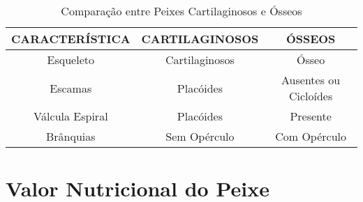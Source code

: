 \documentclass[a4paper, 11pt]{article}
\begin{document}
\begin{table}[h!]
\centering
\caption{Comparação entre Peixes Cartilaginosos e Ósseos}
\vskip 0.6cm
\begin{tabular}{c||c c}
\hline
\textbf{CARACTERÍSTICA} & \textbf{CARTILAGINOSOS} & \textbf{ÓSSEOS} \\
\hline
\hline
Esqueleto               & Cartilaginosos          & Ósseo \\
Escamas                 & Placóides               & Ausentes ou Cicloídes \\
Válcula Espiral         & Placóides               & Presente \\
Brânquias               & Sem Opérculo            & Com Opérculo \\
\hline
\end{tabular}
\end{table}

	\section{Valor Nutricional do Peixe}

	\tableofcontents
	\listoffigures
	\listoftables
\end{document}
